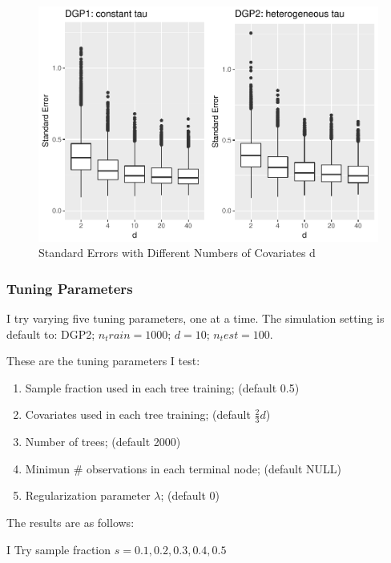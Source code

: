\documentclass[]{article}
\providecommand{\tightlist}{%
  \setlength{\itemsep}{0pt}\setlength{\parskip}{0pt}}
\begin{document}
\begin{figure}
\centering
\includegraphics{report_files/figure-latex/fig4-1.pdf}
\caption{\label{fig:fig4}Standard Errors with Different Numbers of
Covariates d}
\end{figure}

\subsubsection{Tuning Parameters}\label{tuning-parameters}

I try varying five tuning parameters, one at a time. The simulation
setting is default to: DGP2; \(n_train=1000\); \(d=10\); \(n_test=100\).

These are the tuning parameters I test:

\begin{enumerate}
\def\labelenumi{\arabic{enumi}.}
\tightlist
\item
  Sample fraction used in each tree training; (default 0.5)
\item
  Covariates used in each tree training; (default \(\frac{2}{3}d\))
\item
  Number of trees; (default 2000)
\item
  Minimun \# observations in each terminal node; (default NULL)
\item
  Regularization parameter \(\lambda\); (default 0)
\end{enumerate}

The results are as follows:

I Try sample fraction \(s = 0.1, 0.2, 0.3, 0.4, 0.5\)
\end{document}
